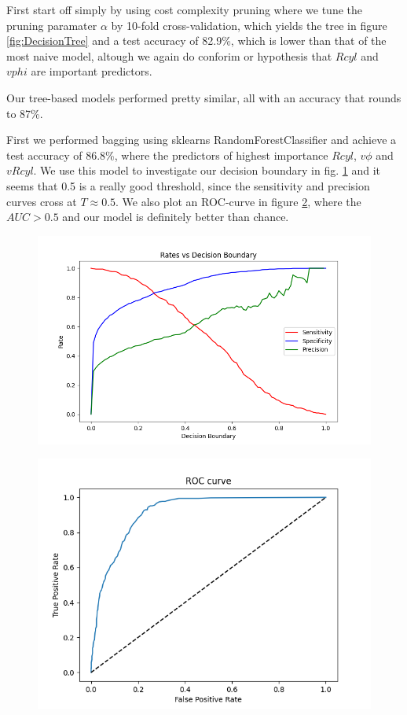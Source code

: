 First start off simply by using cost complexity pruning where we tune the pruning paramater $\alpha$ by 10-fold cross-validation, which yields the tree in figure \ref{fig:DecisionTree} and a test accuracy of 82.9\%, which is lower than that of the most naive model, altough we again do conforim or hypothesis that $Rcyl$ and $vphi$ are important predictors.

Our tree-based models performed pretty similar, all with an accuracy that rounds to 87\%.

First we performed bagging using sklearns RandomForestClassifier and achieve a test accuracy of 86.8\%, where the predictors of highest importance $Rcyl$, $v\phi$ and $vRcyl$. We use this model to investigate our decision boundary in fig. \ref{fig:ratevsdb} and it seems that 0.5 is a really good threshold, since the sensitivity and precision curves cross at $T\approx0.5$. We also plot an ROC-curve in figure \ref{fig:ROC}, where the $AUC>0.5$ and our model is definitely better than chance.


\begin{figure}[h!]
    \centering
    \includegraphics[width=0.75\columnwidth]{Plots/Rates_vs_DecisionBoundary.png}
    \caption{}
    \label{fig:ratevsdb}
\end{figure}

\begin{figure}[h!]
    \centering
    \includegraphics[width=0.8\columnwidth]{Plots/ROC_curve.png}
    \caption{}
    \label{fig:ROC}
\end{figure}
\newpage

